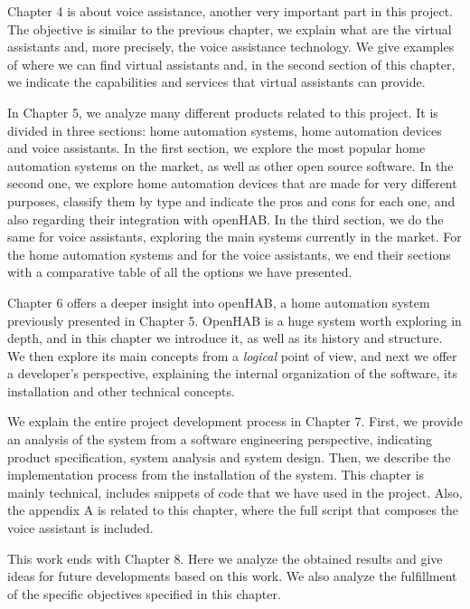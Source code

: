 Chapter 4 is about voice assistance, another very important part in this project. The objective is similar to the previous
chapter, we explain what are the virtual assistants and, more precisely, the voice assistance technology. We give examples of where
we can find virtual assistants and, in the second section of this chapter, we indicate the capabilities and services that virtual
assistants can provide.

In Chapter 5, we analyze many different products related to this project. It is divided in three sections: home automation
systems, home automation devices and voice assistants. In the first section, we explore the most popular home automation systems
on the market, as well as other open source software. In the second one, we explore home automation devices that are made for very
different purposes, classify them by type and indicate the pros and cons for each one, and also regarding their integration with openHAB.
In the third section, we do the same for voice assistants, exploring the main systems currently in the market. For the home automation
systems and for the voice assistants, we end their sections with a comparative table of all the options we have presented.

Chapter 6 offers a deeper insight into openHAB, a home automation system previously presented in Chapter 5. OpenHAB is a
huge system worth exploring in depth, and in this chapter we introduce it, as well as its history and structure. We then explore its
main concepts from a \textit{logical} point of view, and next we offer a developer's perspective, explaining the internal organization
of the software, its installation and other technical concepts.

We explain the entire project development process in Chapter 7. First, we provide an analysis of the system from a software
engineering perspective, indicating product specification, system analysis and system design. Then, we describe the implementation
process from the installation of the system. This chapter is mainly technical, includes snippets of code that we have used in the
project. Also, the appendix A is related to this chapter, where the full script that composes the voice assistant is included.

This work ends with Chapter 8. Here we analyze the obtained results and give ideas for future developments based on this
work. We also analyze the fulfillment of the specific objectives specified in this chapter.

